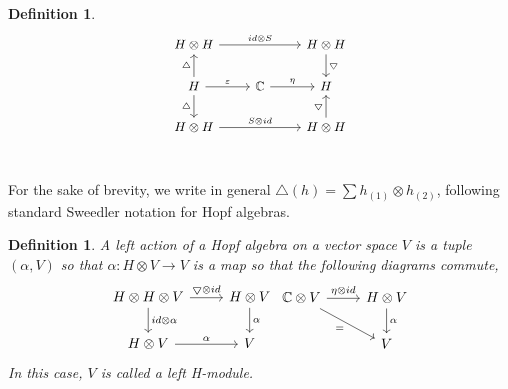 \documentclass[12pt,a4paper]{article}
\newtheorem{definition}[theorem]{Definition}
\newcommand\1{_{(1)}}
\newcommand\2{_{(2)}}
\begin{document}
\begin{definition}
\[\begin{small}
\begin{tikzcd}
H\otimes H \arrow[rr, "id\otimes S"]                                      &                       & H\otimes H \arrow[d, "\bigtriangledown"] \\
H \arrow[u, "\triangle"] \arrow[d, "\triangle"'] \arrow[r, "\varepsilon"] & \mathbb{C} \arrow[r, "\eta"] & H                                     \\
H\otimes H \arrow[rr, "S\otimes id"]                                      &                       & H\otimes H \arrow[u, "\bigtriangledown"]
\end{tikzcd}
\end{small}
\]\\
\end{definition}

For the sake of brevity, we write in general $\triangle(h)=\sum h\1\otimes h\2$, following standard Sweedler notation for Hopf algebras.\\

\begin{definition} A left action of a Hopf algebra on a vector space $V$ is a tuple $(\alpha, V)$ so that
$\alpha:H\otimes V\to V$ is a map so that the following diagrams commute,
\[
\begin{tikzcd}
H\otimes H\otimes V \arrow[r, "\bigtriangledown\otimes id"] \arrow[d, "id\otimes \alpha"] & H\otimes V \arrow[d, "\alpha"] \\
H\otimes V \arrow[r, "\alpha"]                                                         & V                             
\end{tikzcd}
\begin{tikzcd}
\mathbb{C}\otimes V \arrow[r, "\eta\otimes id"] \arrow[rd, "="'] & H\otimes V \arrow[d, "\alpha"] \\
                                                          & V                             
\end{tikzcd}
\]
In this case, $V$ is called a left H-module.
\end{definition}
\end{document}
